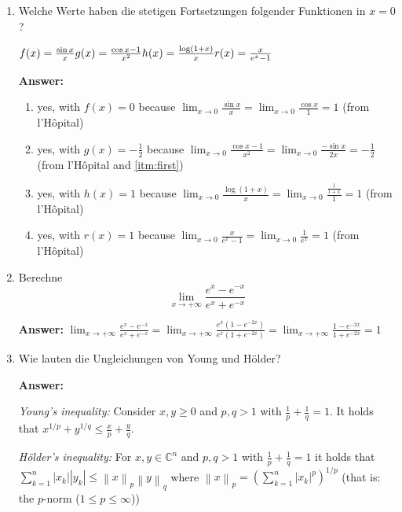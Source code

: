 \documentclass[11pt]{article}
\newcommand{\norm}[1]{\left\lVert#1\right\rVert}
\newcommand{\abs}[1]{\left|#1\right|}
\newcommand{\sumn}[4]{\sum_{#1=#2}^{#3}{#4}}
\newcommand{\CC}[0]{\mathbb{C}}
\begin{document}
\begin{enumerate}
    \item Welche Werte haben die stetigen Fortsetzungen folgender Funktionen in $x = 0$?
    
    \hspace*{\fill}
    $f(x) = \frac{\sin{x}}{x} \hfill g(x) = \frac{\cos{x} - 1}{x^2} \hfill h(x) = \frac{\log(1+x)}{x} \hfill r(x) = \frac{x}{e^x -1}$
    \hspace*{\fill}

    \textbf{Answer:}

    \begin{enumerate}
        \item \label{itm:first} yes, with $f(x) = 0$ because $\lim_{x\to0}\frac{\sin{x}}{x} = \lim_{x\to0} \frac{\cos{x}}{1} = 1$ (from l'Hôpital)
        \item yes, with $g(x) = -\frac{1}{2}$ because $\lim_{x \to 0}\frac{\cos{x} - 1}{x^2} = \lim_{x \to 0}\frac{-\sin{x}}{2x} = -\frac{1}{2}$ (from l'Hôpital and \ref{itm:first})
        \item yes, with $h(x) = 1$ because $\lim_{x \to 0}\frac{\log(1+x)}{x} = \lim_{x \to 0}\frac{\frac{1}{1+x}}{1} = 1$ (from l'Hôpital)
        \item yes, with $r(x) = 1$ because $\lim_{x \to 0}\frac{x}{e^x -1} = \lim_{x \to 0}\frac{1}{e^x} = 1$ (from l'Hôpital)
    \end{enumerate}

    \item Berechne
    $$\lim_{x \to +\infty}\frac{e^x - e^{-x}}{e^x + e^{-x}}$$

    \textbf{Answer:}
    $\lim_{x \to +\infty}\frac{e^x - e^{-x}}{e^x + e^{-x}} = \lim_{x \to +\infty}\frac{e^x(1 - e^{-2x})}{e^x(1 + e^{-2x})} = \lim_{x \to +\infty}\frac{1 - e^{-2x}}{1 + e^{-2x}} = 1$
    \item Wie lauten die Ungleichungen von Young und Hölder?
    
    \textbf{Answer:}

    \textit{Young's inequality:} Consider $x, y \ge 0$ and $p, q > 1$ with $\frac{1}{p} + \frac{1}{q} = 1$. It holds that $x^{1/p} + y^{1/q} \le \frac{x}{p} + \frac{y}{q}$.

    \textit{Hölder's inequality:} For $x, y \in \CC^n$ and $p, q > 1$ with $\frac{1}{p} + \frac{1}{q} = 1$ it holds that $\sumn{k}{1}{n}{\abs{x_k} \abs{y_k}} \le \norm{x}_p \norm{y}_q$ where $\norm{x}_p = \left(\sumn{k}{1}{n}{\abs{x_k}^p}\right)^{1/p}$ (that is: the $p$-norm ($1 \le p \le \infty$))


\end{enumerate}
\end{document}
